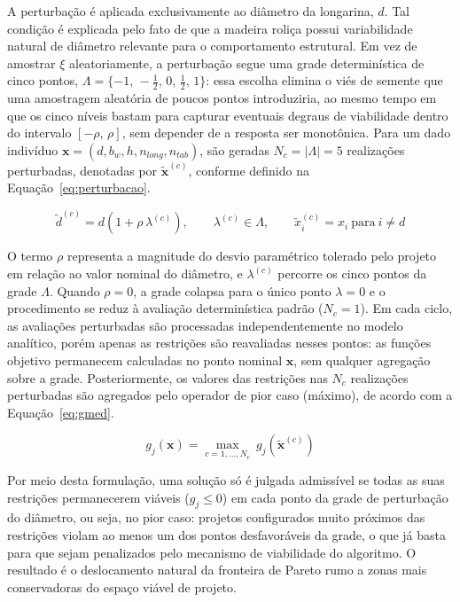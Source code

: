 A perturbação é aplicada exclusivamente ao diâmetro da longarina, $d$. Tal condição é explicada pelo fato de que a madeira roliça possui variabilidade natural de diâmetro relevante para o comportamento estrutural. Em vez de amostrar $\xi$ aleatoriamente, a perturbação segue uma grade determinística de cinco pontos, $\Lambda = \{-1,\,-\tfrac{1}{2},\,0,\,\tfrac{1}{2},\,1\}$: essa escolha elimina o viés de semente que uma amostragem aleatória de poucos pontos introduziria, ao mesmo tempo em que os cinco níveis bastam para capturar eventuais degraus de viabilidade dentro do intervalo $[-\rho,\,\rho]$, sem depender de a resposta ser monotônica.
Para um dado indivíduo $\mathbf{x} = (d, b_w, h, n_{long}, n_{tab})$, são geradas $N_c = |\Lambda| = 5$ realizações perturbadas, denotadas por $\tilde{\mathbf{x}}^{(c)}$, conforme definido na Equação~\eqref{eq:perturbacao}.

 \begin{equation}\tilde{d}^{(c)} = d\left(1 + \rho\,\lambda^{(c)}\right),\qquad \lambda^{(c)} \in \Lambda,\qquad \tilde{x}_i^{(c)} = x_i \ \text{para}\ i \neq d\label{eq:perturbacao}
 \end{equation}

O termo $\rho$ representa a magnitude do desvio paramétrico tolerado pelo projeto em relação ao valor nominal do diâmetro, e $\lambda^{(c)}$ percorre os cinco pontos da grade $\Lambda$.
Quando $\rho = 0$, a grade colapsa para o único ponto $\lambda = 0$ e o procedimento se reduz à avaliação determinística padrão ($N_c = 1$).
Em cada ciclo, as avaliações perturbadas são processadas independentemente no modelo analítico, porém apenas as restrições são reavaliadas nesses pontos: as funções objetivo permanecem calculadas no ponto nominal $\mathbf{x}$, sem qualquer agregação sobre a grade.
Posteriormente, os valores das restrições nas $N_c$ realizações perturbadas são agregados pelo operador de pior caso (máximo), de acordo com a Equação~\eqref{eq:gmed}.

 \begin{equation}g_j(\mathbf{x}) = \max_{c=1,\ldots,N_c}\ g_j\!\left(\tilde{\mathbf{x}}^{(c)}\right)
 \label{eq:gmed}
 \end{equation}

Por meio desta formulação, uma solução só é julgada admissível se todas as suas restrições permanecerem viáveis ($g_j \leq 0$) em cada ponto da grade de perturbação do diâmetro, ou seja, no pior caso: projetos configurados muito próximos das restrições violam ao menos um dos pontos desfavoráveis da grade, o que já basta para que sejam penalizados pelo mecanismo de viabilidade do algoritmo.
O resultado é o deslocamento natural da fronteira de Pareto rumo a zonas mais conservadoras do espaço viável de projeto.


